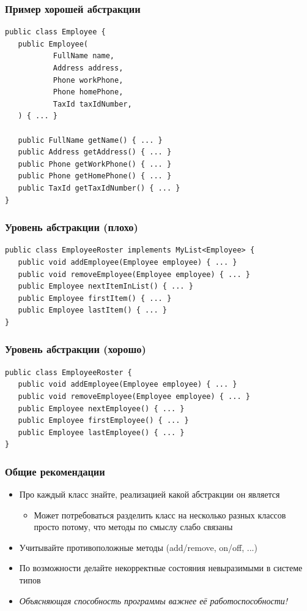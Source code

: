 \documentclass[xetex,mathserif,serif]{beamer}
\begin{document}
    \begin{frame}[fragile]
        \frametitle{Пример хорошей абстракции}
        \begin{footnotesize}
            \begin{verbatim}
public class Employee {
   public Employee(
           FullName name,
           Address address,
           Phone workPhone,
           Phone homePhone,
           TaxId taxIdNumber,
   ) { ... }

   public FullName getName() { ... }
   public Address getAddress() { ... }
   public Phone getWorkPhone() { ... }
   public Phone getHomePhone() { ... }
   public TaxId getTaxIdNumber() { ... }
}
            \end{verbatim}
        \end{footnotesize}
\end{frame}

    \begin{frame}[fragile]
        \frametitle{Уровень абстракции (плохо)}
        \begin{verbatim}
public class EmployeeRoster implements MyList<Employee> {
   public void addEmployee(Employee employee) { ... }
   public void removeEmployee(Employee employee) { ... }
   public Employee nextItemInList() { ... }
   public Employee firstItem() { ... }
   public Employee lastItem() { ... }
}
        \end{verbatim}
\end{frame}

    \begin{frame}[fragile]
        \frametitle{Уровень абстракции (хорошо)}
        \begin{verbatim}
public class EmployeeRoster {
   public void addEmployee(Employee employee) { ... }
   public void removeEmployee(Employee employee) { ... }
   public Employee nextEmployee() { ... }
   public Employee firstEmployee() { ... }
   public Employee lastEmployee() { ... }
}
        \end{verbatim}
\end{frame}

    \begin{frame}
        \frametitle{Общие рекомендации}
        \begin{itemize}
            \item Про каждый класс знайте, реализацией какой абстракции он является
            \begin{itemize}
                \item Может потребоваться разделить класс на несколько разных классов просто потому, что методы по смыслу слабо связаны
            \end{itemize}
            \item Учитывайте противоположные методы (add/remove, on/off, ...)
            \item По возможности делайте некорректные состояния невыразимыми в системе типов
            \item \textit{Объясняющая способность программы важнее её работоспособности!}
        \end{itemize}
    \end{frame}
\end{document}

